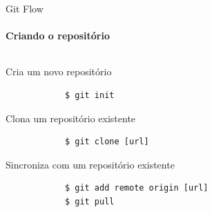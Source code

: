 \documentclass[xcolor=dvipsnames,t]{beamer}
\begin{document}
\begin{frame}[fragile]{Git Flow}
\framesubtitle{Criando o repositório}

\begin{columns}[t]
	
	\begin{column}{.7\textwidth}
		\vspace{0.3 cm}
		\begin{block}{Cria um novo repositório}		
			\begin{verbatim}
			$ git init
			\end{verbatim}
		\end{block}		
		\vspace{0.5 cm}
		\begin{alertblock}{Clona um repositório existente}		
			\begin{verbatim}
			$ git clone [url]
			\end{verbatim}
		\end{alertblock}
		
		\begin{alertblock}{Sincroniza com um repositório existente}		
			\begin{verbatim}
			$ git add remote origin [url]
			$ git pull 
			\end{verbatim}
		\end{alertblock}
		
	\end{column}


\end{columns}
\end{frame}
\end{document}
